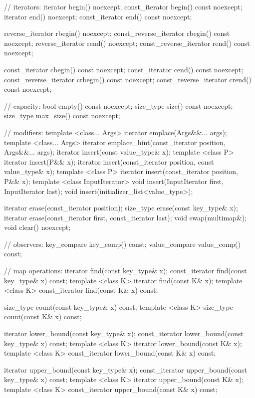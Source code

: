 \begin{codeblock}
{{    // iterators:
    iterator               begin() noexcept;
    const_iterator         begin() const noexcept;
    iterator               end() noexcept;
    const_iterator         end() const noexcept;

    reverse_iterator       rbegin() noexcept;
    const_reverse_iterator rbegin() const noexcept;
    reverse_iterator       rend() noexcept;
    const_reverse_iterator rend() const noexcept;

    const_iterator         cbegin() const noexcept;
    const_iterator         cend() const noexcept;
    const_reverse_iterator crbegin() const noexcept;
    const_reverse_iterator crend() const noexcept;

    // capacity:
    bool           empty() const noexcept;
    size_type      size() const noexcept;
    size_type      max_size() const noexcept;

    // modifiers:
    template <class... Args> iterator emplace(Args&&... args);
    template <class... Args> iterator emplace_hint(const_iterator position, Args&&... args);
    iterator insert(const value_type& x);
    template <class P> iterator insert(P&& x);
    iterator insert(const_iterator position, const value_type& x);
    template <class P> iterator insert(const_iterator position, P&& x);
    template <class InputIterator>
      void insert(InputIterator first, InputIterator last);
    void insert(initializer_list<value_type>);

    iterator  erase(const_iterator position);
    size_type erase(const key_type& x);
    iterator  erase(const_iterator first, const_iterator last);
    void swap(multimap&);
    void clear() noexcept;

    // observers:
    key_compare    key_comp() const;
    value_compare  value_comp() const;

    // map operations:
    iterator       find(const key_type& x);
    const_iterator find(const key_type& x) const;
    template <class K> iterator       find(const K& x);
    template <class K> const_iterator find(const K& x) const;

    size_type      count(const key_type& x) const;
    template <class K> size_type count(const K& x) const;

    iterator       lower_bound(const key_type& x);
    const_iterator lower_bound(const key_type& x) const;
    template <class K> iterator       lower_bound(const K& x);
    template <class K> const_iterator lower_bound(const K& x) const;

    iterator       upper_bound(const key_type& x);
    const_iterator upper_bound(const key_type& x) const;
    template <class K> iterator       upper_bound(const K& x);
    template <class K> const_iterator upper_bound(const K& x) const;

}}
\end{codeblock}

